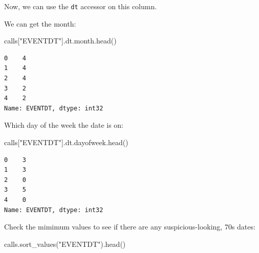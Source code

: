 \documentclass[
  letterpaper,
  DIV=11,
  numbers=noendperiod]{scrreprt}
\newenvironment{Shaded}{\begin{snugshade}}{\end{snugshade}}
\newcommand{\NormalTok}[1]{\textcolor[rgb]{0.00,0.23,0.31}{#1}}
\newcommand{\StringTok}[1]{\textcolor[rgb]{0.13,0.47,0.30}{#1}}
\begin{document}
Now, we can use the \texttt{dt} accessor on this column.

We can get the month:

\begin{Shaded}
\begin{Highlighting}[]
\NormalTok{calls[}\StringTok{"EVENTDT"}\NormalTok{].dt.month.head()}
\end{Highlighting}
\end{Shaded}

\begin{verbatim}
0    4
1    4
2    4
3    2
4    2
Name: EVENTDT, dtype: int32
\end{verbatim}

Which day of the week the date is on:

\begin{Shaded}
\begin{Highlighting}[]
\NormalTok{calls[}\StringTok{"EVENTDT"}\NormalTok{].dt.dayofweek.head()}
\end{Highlighting}
\end{Shaded}

\begin{verbatim}
0    3
1    3
2    0
3    5
4    0
Name: EVENTDT, dtype: int32
\end{verbatim}

Check the mimimum values to see if there are any suspicious-looking, 70s
dates:

\begin{Shaded}
\begin{Highlighting}[]
\NormalTok{calls.sort\_values(}\StringTok{"EVENTDT"}\NormalTok{).head()}
\end{Highlighting}
\end{Shaded}
\end{document}

